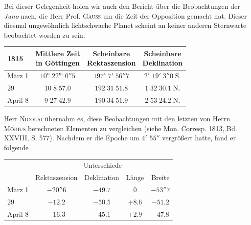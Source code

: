 \par\indent Bei dieser Gelegenheit holen wir auch den Bericht über die Beobachtungen der \emph{Juno} nach, die Herr Prof. \textsc{Gauss} um die Zeit der Opposition gemacht hat. Dieser diesmal ungewöhnlich lichtschwache Planet scheint an keiner anderen Sternwarte beobachtet worden zu sein.

\begin{center}\fontsize{10}{12}\selectfont\setlength{\tabcolsep}{5pt}\renewcommand{\arraystretch}{1.15}\begin{tabular}{l|c|c|c}
1815 & \shortstack{Mittlere Zeit\\in Göttingen} & \shortstack{Scheinbare\\Rektaszension} & \shortstack{Scheinbare\\Deklination}\\\hline
März 1 & $10^{\mathrm u}\;22^{\mathrm m}\;0''5$ & $197^\circ\;7'\;56''7$ & $2^\circ\;19'\;3''0\;\mathrm{S.}$\\
29 & $10\;8\;57.0$ & $192\;31\;51.8$ & $1\;32\;30.1\;\mathrm{N.}$\\
April 8 & $9\;27\;42.9$ & $190\;34\;51.9$ & $2\;53\;24.2\;\mathrm{N.}$\\
\end{tabular}\end{center}

\par\indent Herr \textsc{Nicolai} übernahm es, diese Beobachtungen mit den letzten von Herrn \textsc{Möbius} berechneten Elementen zu vergleichen (siehe Mon. Corresp. 1813, Bd. XXVIII, S. 577). Nachdem er die Epoche um $4'$ $55''$ vergrößert hatte, fand er folgende

\begin{center}
\fontsize{10}{12}\selectfont\setlength{\tabcolsep}{6pt}\renewcommand{\arraystretch}{1.15}\begin{tabular}{l | c | c | c | c}
& \multicolumn{4}{c}{Unterschiede} \\
& Rektaszension & Deklination & Länge & Breite \\
\hline
März 1 & $-20''6$ & $-49.7$ & $0$ & $-53''7$ \\
29 & $-12.2$ & $-50.5$ & $+8.6$ & $-51.2$ \\
April 8 & $-16.3$ & $-45.1$ & $+2.9$ & $-47.8$ \\
\end{tabular}
\end{center}

